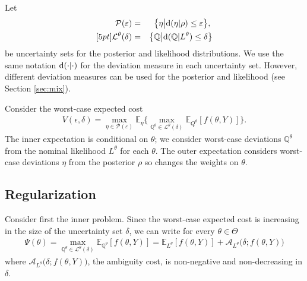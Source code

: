 \documentclass[11pt,reqno,letter]{amsart}
\theoremstyle{plain}
\theoremstyle{definition}
\numberwithin{equation}{section}
\numberwithin{theorem}{section}
\numberwithin{table}{section}
\numberwithin{figure}{section}
\begin{document}
Let
\begin{eqnarray}
 \label{eq:uncertainty-set}
{\mathcal P}(\varepsilon) & = & \big\{ \eta\big\vert {\rm d}(\eta|\rho)\leq \varepsilon\big\},\; \\  [5pt]
{\mathcal L}^\theta(\delta) & =& \big\{{\mathbb Q}\big\vert {\rm d}({\mathbb Q}|L^\theta)\leq\delta\big\} \nonumber
\end{eqnarray}
be uncertainty sets for the posterior and likelihood distributions. We use the same notation ${\rm d}(\cdot|\cdot)$ for the deviation measure in each uncertainty set. However, different deviation measures can be used for the posterior and likelihood (see Section \ref{sec:mix}).

Consider the worst-case expected cost
\begin{eqnarray}
V(\epsilon, \delta) 
= \max_{\eta \in {\mathcal P}(\varepsilon)} {\mathbb E}_\eta \Big\{\max_{{\mathbb Q}^\theta \in {\mathcal L}^\theta(\delta)} {\mathbb E}_{Q^\theta} [f(\theta, Y)] \Big\}.
\label{eq:wc_Bayes}
\end{eqnarray}
The inner expectation is conditional on $\theta$; we consider worst-case deviations ${\mathbb Q}^\theta$ from the nominal likelihood $L^\theta$ for each $\theta$. The outer expectation considers worst-case deviations $\eta$ from the posterior $\rho$ so changes the weights on $\theta$. 

\subsection{Regularization}

Consider first the inner problem. Since the worst-case expected cost is increasing in the size of the uncertainty set $\delta$, we can write for every $\theta\in\Theta$
\begin{eqnarray}
\Psi(\theta) = \max_{{\mathbb Q}^\theta \in {\mathcal L}^\theta(\delta)} {\mathbb E}_{{\mathbb Q}^\theta} [f(\theta, Y)] 
   =    {\mathbb E}_{L^\theta}[f(\theta, Y)]  + {\mathcal A}_{L^\theta}\big(\delta; f(\theta, Y)\big)
   \label{eq:inner}
   \end{eqnarray}
where   ${\mathcal A}_{L^\theta}\big(\delta; f(\theta, Y)\big)$, the ambiguity cost, is non-negative and non-decreasing in $\delta$. 
\end{document}
